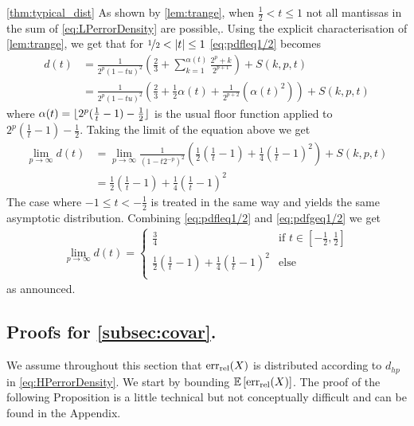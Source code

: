 \begin{myproof}{\cref{thm:typical_dist}}
As shown by \cref{lem:trange}, when $\frac{1}{2}< t\leq 1$  not all mantissas in the sum of \cref{eq:LPerrorDensity} are possible,. Using the explicit characterisation of \cref{lem:trange}, we get that for $\nicefrac{1}{2}< \left\lvert t\right\rvert\leq 1$ \eqref{eq:pdfleq1/2} becomes 
\begin{align*}
d(t)&=\frac{1}{2^p(1-tu)^2}\left(\frac{2}{3}+\sum_{k=1}^{\alpha(t)}\frac{2^p+k}{2^{p+1}}\right) + S(k,p,t)
\\
&=\frac{1}{2^p(1-tu)^2}\left(\frac{2}{3}+\frac{1}{2}\alpha(t)+\frac{1}{2^{p+2}}(\alpha(t)^2)\right)+ S(k,p,t)
\end{align*}
where $\alpha(t)=\lfloor 2^p(\frac{1}{t}-1)-\frac{1}{2} \rfloor$ is the usual floor function applied to $2^p(\frac{1}{t}-1)-\frac{1}{2}$.  Taking the limit of the equation above we get
\begin{align}
\lim_{p\to\infty}d(t) & = \lim_{p\to\infty}  \frac{1}{(1-t2^{-p})^2}\left(\frac{1}{2}\left(\frac{1}{t}-1\right)+\frac{1}{4}\left(\frac{1}{t}-1\right)^2\right)+S(k,p,t)\nonumber \\
&= \frac{1}{2}\left(\frac{1}{t}-1\right)+\frac{1}{4}\left(\frac{1}{t}-1\right)^2\label{eq:pdfgeq1/2}
\end{align}
The case where $-1\leq t< -\frac{1}{2}$ is treated in the same way and yields the same asymptotic distribution.  Combining \ref{eq:pdfleq1/2} and \ref{eq:pdfgeq1/2} we get
\begin{align*}
\lim_{p\to\infty}d(t) =\begin{cases}
\frac{3}{4}&\text{if }t\in\left[-\frac{1}{2} ,\frac{1}{2}\right]  \\
\frac{1}{2}\left(\frac{1}{t}-1\right)+\frac{1}{4}\left(\frac{1}{t}-1\right)^2& \text{else }\\
\end{cases}
\end{align*}
as announced.
\end{myproof}

\subsection*{Proofs for \cref{subsec:covar}.}

We assume throughout this section that $\mathrm{err}_{\mathrm{rel}}(X)$ is distributed according to $d_{hp}$ in \cref{eq:HPerrorDensity}.
We start by bounding $\mathbb{E}\left[\mathrm{err}_{\mathrm{rel}}(X)\right]$. The proof of the following Proposition is a little technical but not conceptually difficult and can be found in the Appendix.

